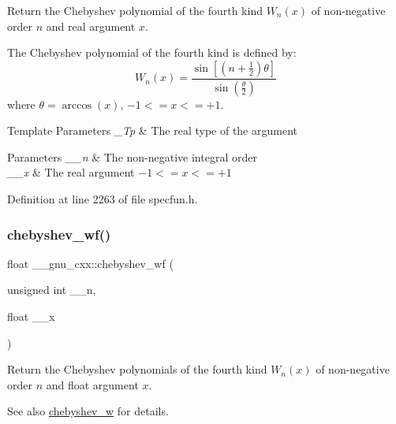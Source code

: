 Return the Chebyshev polynomial of the fourth kind $ W_n(x) $ of non-\/negative order $ n $ and real argument $ x $.

The Chebyshev polynomial of the fourth kind is defined by\+: \[ W_n(x) = \frac{\sin \left[ \left(n+\frac{1}{2}\right)\theta \right]} {\sin \left(\frac{\theta}{2}\right)} \] where $ \theta = \arccos(x) $, $ -1 <= x <= +1 $.


\begin{DoxyTemplParams}{Template Parameters}
{\em \+\_\+\+Tp} & The real type of the argument \\
\hline
\end{DoxyTemplParams}

\begin{DoxyParams}{Parameters}
{\em \+\_\+\+\_\+n} & The non-\/negative integral order \\
\hline
{\em \+\_\+\+\_\+x} & The real argument $ -1 <= x <= +1 $ \\
\hline
\end{DoxyParams}


Definition at line 2263 of file specfun.\+h.

\mbox{\label{group__gnu__math__spec__func_gae6d468cee53df584e40afe294127b090}} 
\subsubsection{\texorpdfstring{chebyshev\+\_\+wf()}{chebyshev\_wf()}}
{\footnotesize\ttfamily float \+\_\+\+\_\+gnu\+\_\+cxx\+::chebyshev\+\_\+wf (\begin{DoxyParamCaption}\item[{unsigned int}]{\+\_\+\+\_\+n,  }\item[{float}]{\+\_\+\+\_\+x }\end{DoxyParamCaption})\hspace{0.3cm}{\ttfamily [inline]}}

Return the Chebyshev polynomials of the fourth kind $ W_n(x) $ of non-\/negative order $ n $ and {\ttfamily float} argument $ x $.

\begin{DoxySeeAlso}{See also}
\hyperlink{group__gnu__math__spec__func_gaa156c6c21e99104ebcb627e92aceada0}{chebyshev\+\_\+w} for details. 
\end{DoxySeeAlso}


